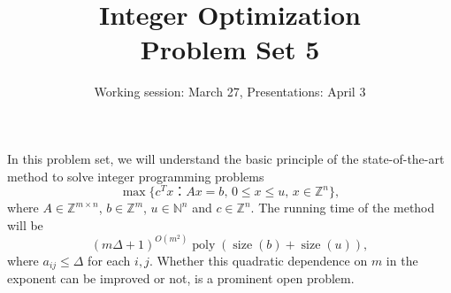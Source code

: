 \documentclass[11pt,a4paper]{article}
\title{Integer Optimization  \\ Problem Set 5 }
\date{Working session: March 27, Presentations: April 3}
\DeclareMathOperator{\poly}{poly}
\DeclareMathOperator{\size}{size}
\begin{document}
\maketitle 

\noindent
In this problem set, we will understand the basic principle of  the state-of-the-art method to solve integer programming problems
\begin{equation}
  \label{eq:1}
  \max\{c^T x ： Ax = b, \, 0 ≤ x ≤ u, \, x ∈ℤ^n\},
\end{equation}
where $A ∈ℤ^{m × n }$, $b ∈ ℤ^m$, $u ∈ℕ^n$ and $c ∈ℤ^n$. The running time of the method will be
\begin{equation}
  \label{eq:2}
  (mΔ +1)^{O(m^2)}  \poly(\size(b)+\size(u)), 
\end{equation}
where $a_{ij} ≤Δ$ for each $i,j$. Whether this quadratic dependence on $m$ in the exponent can be improved or not, is a prominent open problem.  
\end{document}
